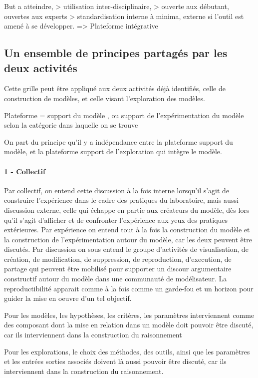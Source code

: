 But a atteindre, 
> utilisation inter-disciplinaire, 
> ouverte aux débutant, ouvertes aux experts
> standardisation interne à minima, externe si l'outil est amené à se développer.
=> Plateforme intégrative 


\subsection{Un ensemble de principes partagés par les deux activités}

Cette grille peut être appliqué aux deux activités déjà identifiés, celle de construction de modèles, et celle visant l'exploration des modèles.

Plateforme = support du modèle , ou support de l'expérimentation du modèle selon la catégorie dans laquelle on se trouve

On part du principe qu'il y a indépendance entre la plateforme support du modèle, et la plateforme support de l'exploration qui intègre le modèle.

\paragraph{1 - Collectif}

Par collectif, on entend cette discussion à la fois interne lorsqu'il s'agit de construire l'expérience dans le cadre des pratiques du laboratoire, mais aussi discussion externe, celle qui échappe en partie aux créateurs du modèle, dès lors qu'il s'agit d'afficher et de confronter l'expérience aux yeux des pratiques extérieures. Par expérience on entend tout à la fois la construction du modèle et la construction de l'expérimentation autour du modèle, car les deux peuvent être discutés.
Par discussion on sous entend le groupe d'activités de visualisation, de création, de modification, de suppression, de reproduction, d'execution, de partage qui peuvent être mobilisé pour supporter un discour argumentaire constructif autour du modèle dans une communauté de modélisateur. La reproductibilité apparait comme à la fois comme un garde-fou et un horizon pour guider la mise en oeuvre d'un tel objectif. 

Pour les modèles, les hypothèses, les critères, les paramètres interviennent comme des composant dont la mise en relation dans un modèle doit pouvoir être discuté, car ils interviennent dans la construction du raisonnement

Pour les explorations, le choix des méthodes, des outils, ainsi que les paramètres et les entrées sorties associés doivent là aussi pouvoir être discuté, car ils interviennent dans la construction du raisonnement.

